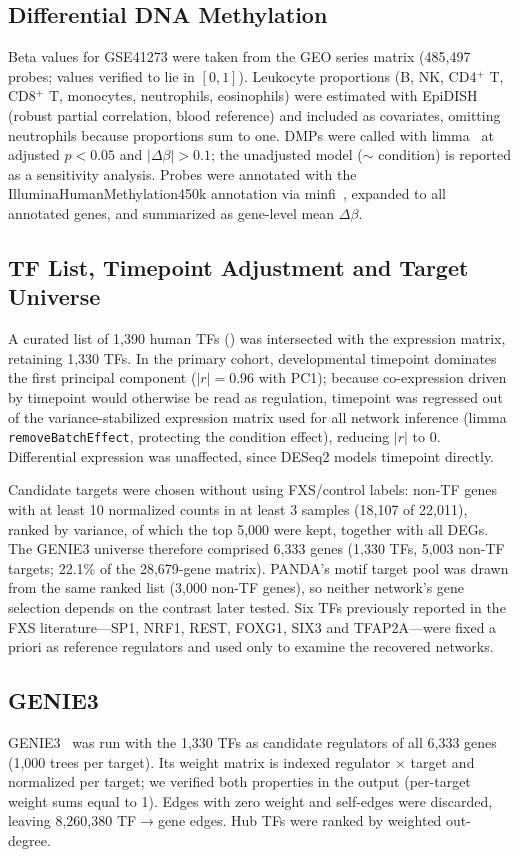 \documentclass[journal]{IEEEtran}
\begin{document}
\subsection{Differential DNA Methylation}
Beta values for GSE41273 were taken from the GEO series matrix (485,497 probes; values verified to lie in $[0,1]$). Leukocyte proportions (B, NK, CD4$^+$ T, CD8$^+$ T, monocytes, neutrophils, eosinophils) were estimated with EpiDISH~\cite{epidish} (robust partial correlation, blood reference) and included as covariates, omitting neutrophils because proportions sum to one. DMPs were called with limma~\cite{limma} at adjusted $p<0.05$ and $|\Delta\beta|>0.1$; the unadjusted model ($\sim$ condition) is reported as a sensitivity analysis. Probes were annotated with the IlluminaHumanMethylation450k annotation via minfi~\cite{minfi}, expanded to all annotated genes, and summarized as gene-level mean $\Delta\beta$.

\subsection{TF List, Timepoint Adjustment and Target Universe}\label{sec:universe}
A curated list of 1,390 human TFs () was intersected with the expression matrix, retaining 1,330 TFs. In the primary cohort, developmental timepoint dominates the first principal component ($|r|=0.96$ with PC1); because co-expression driven by timepoint would otherwise be read as regulation, timepoint was regressed out of the variance-stabilized expression matrix used for all network inference (limma \texttt{removeBatchEffect}, protecting the condition effect), reducing $|r|$ to 0. Differential expression was unaffected, since DESeq2 models timepoint directly.

Candidate targets were chosen without using FXS/control labels: non-TF genes with at least 10 normalized counts in at least 3 samples (18,107 of 22,011), ranked by variance, of which the top 5,000 were kept, together with all DEGs. The GENIE3 universe therefore comprised 6,333 genes (1,330 TFs, 5,003 non-TF targets; 22.1\% of the 28,679-gene matrix). PANDA's motif target pool was drawn from the same ranked list (3,000 non-TF genes), so neither network's gene selection depends on the contrast later tested. Six TFs previously reported in the FXS literature---SP1, NRF1, REST, FOXG1, SIX3 and TFAP2A---were fixed a priori as reference regulators and used only to examine the recovered networks.

\subsection{GENIE3}
GENIE3~\cite{genie3} was run with the 1,330 TFs as candidate regulators of all 6,333 genes (1,000 trees per target). Its weight matrix is indexed regulator $\times$ target and normalized per target; we verified both properties in the output (per-target weight sums equal to 1). Edges with zero weight and self-edges were discarded, leaving 8,260,380 TF$\rightarrow$gene edges. Hub TFs were ranked by weighted out-degree.
\end{document}
